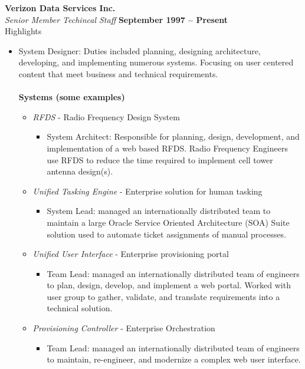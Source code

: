 \documentclass[margin,line]{resume}
\begin{document}
\begin{resume}
    \textbf{\listing Verizon Data Services Inc.} \vspace{2mm}\\\vspace{1mm}%
    \textsl{Senior Member Techincal Staff} \hfill \textbf{September 1997 -- Present}\\
    \textsf{\textmd{Highlights}}\\
    \begin{itemize}
    \item System Designer: Duties included planning, designing architecture, developing, and implementing numerous systems. Focusing on user centered content that meet business and technical requirements.\\\\
      \textbf{Systems \textmd{(some examples)}}
      \begin{itemize}
      \item \textsl{RFDS} - Radio Frequency Design System
      \begin{itemize}
          \item System Architect: Responsible for planning, design, development, and implementation of a web based RFDS. Radio Frequency Engineers use RFDS to reduce the time required to implement cell tower antenna design(s). 
      \end{itemize}
      \item \textsl{Unified Tasking Engine} - Enterprise solution for human tasking
      \begin{itemize}
          \item System Lead: managed an internationally distributed team to maintain a large Oracle Service Oriented Architecture (SOA) Suite solution used to automate ticket assignments of manual processes.
      \end{itemize}
      \item \textsl{Unified User Interface} - Enterprise provisioning portal
      \begin{itemize}
          \item Team Lead: managed an internationally distributed team of engineers to plan, design, develop, and implement a web portal. Worked with user group to gather, validate, and translate requirements into a technical solution.
      \end{itemize}
      \item \textsl{Provisioning Controller} - Enterprise Orchestration
      \begin{itemize}
          \item Team Lead: managed an internationally distributed team of engineers to maintain, re-engineer, and modernize a complex web user interface.

\end{itemize}
\end{itemize}
\end{itemize}
\end{resume}
\end{document}

